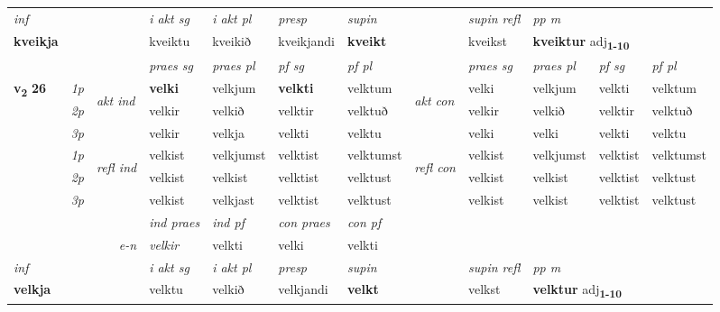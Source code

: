 \begin{longtable}[l]{X>{\footnotesize\itshape}llXXXXlXXXX}
   {\textit{inf}} & &  & \textit{i akt sg} & \textit{i akt pl}   & \textit{presp} & \textit{supin} && \textit{supin refl} & \textit{pp m} \\*
  {\textbf{kveikja}} & && kveiktu  & kveikið   & kveikjandi &  \textbf{kveikt} && kveikst & \multicolumn{2}{l}{\textbf{kveiktur} adj\textbf{\textsubscript{1-10}}} \\*

\midrule

 & &   & \textit{praes sg}  & \textit{praes pl}    & \textit{ pf sg} & \textit{pf pl} & & \textit{praes sg}  & \textit{praes pl}    & \textit{pf sg} & \textit{pf pl }  \\ \cmidrule{4-7} \cmidrule{9-12}
 \multirow{2}{*}{{{\textbf{v{\textsubscript{2}}} \Large{\textbf{26}}}}}  & 1p & \multirow{3}{*}{\begin{turn}{90}\textit{akt ind}\end{turn}} & \textbf{velki} & velkjum & \textbf{velkti} & velktum & \multirow{3}{*}{\begin{turn}{90}\textit{akt con}\end{turn}} &velki & velkjum & velkti & velktum\\*
 & 2p &  &  velkir  & velkið & velktir & velktuð & & velkir & velkið & velktir & velktuð \\*
 & 3p &  & velkir & velkja & velkti & velktu & & velki & velki& velkti & velktu \\*
\cmidrule{4-7} \cmidrule{9-12}
 & 1p & \multirow{3}{*}{\begin{turn}{90}\textit{refl ind}\end{turn}}  & velkist & velkjumst & velktist & velktumst & \multirow{3}{*}{\begin{turn}{90}\textit{refl con}\end{turn}}  &velkist & velkjumst & velktist & velktumst \\*
 & 2p &  & velkist & velkist & velktist & velktust & &velkist & velkist & velktist & velktust \\*
 & 3p  & & velkist & velkjast & velktist & velktust & & velkist & velkist& velktist & velktust \\*
\cmidrule{4-7} \cmidrule{9-12}

   && &  \textit{ind praes} & \textit{ind pf} & \textit{con praes} & \textit{con pf} \\*
\multicolumn{3}{r}{\textit{e-n}} & velkir & velkti & velki & velkti \\*

\cmidrule{4-7}
   {\textit{inf}} & &  & \textit{i akt sg} & \textit{i akt pl}   & \textit{presp} & \textit{supin} && \textit{supin refl} & \textit{pp m} \\*
  {\textbf{velkja}} & && velktu  & velkið   & velkjandi &  \textbf{velkt} && velkst & \multicolumn{2}{l}{\textbf{velktur} adj\textbf{\textsubscript{1-10}}} \\*


\end{longtable}
